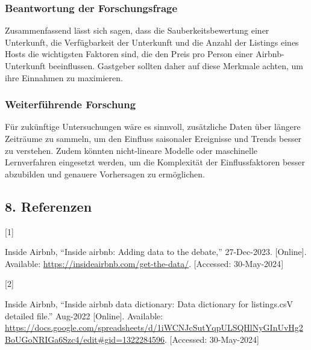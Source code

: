\documentclass[
  journal,
]{IEEEtran}%
\newlength{\cslhangindent}
\newlength{\csllabelwidth}
\newlength{\cslentryspacingunit} %
\newenvironment{CSLReferences}[2] %
 {%
  \setlength{\parindent}{0pt}
  \ifodd #1
  \let\oldpar\par
  \def\par{\hangindent=\cslhangindent\oldpar}
  \fi
  \setlength{\parskip}{#2\cslentryspacingunit}
 }%
 {}
\newcommand{\CSLLeftMargin}[1]{\parbox[t]{\csllabelwidth}{#1}}
\newcommand{\CSLRightInline}[1]{\parbox[t]{\linewidth - \csllabelwidth}{#1}\break}
\begin{document}
\hypertarget{beantwortung-der-forschungsfrage}{%
\subsubsection{Beantwortung der
Forschungsfrage}\label{beantwortung-der-forschungsfrage}}

Zusammenfassend lässt sich sagen, dass die Sauberkeitsbewertung einer
Unterkunft, die Verfügbarkeit der Unterkunft und die Anzahl der Listings
eines Hosts die wichtigsten Faktoren sind, die den Preis pro Person
einer Airbnb-Unterkunft beeinflussen. Gastgeber sollten daher auf diese
Merkmale achten, um ihre Einnahmen zu maximieren.

\hypertarget{weiterfuxfchrende-forschung}{%
\subsubsection{Weiterführende
Forschung}\label{weiterfuxfchrende-forschung}}

Für zukünftige Untersuchungen wäre es sinnvoll, zusätzliche Daten über
längere Zeiträume zu sammeln, um den Einfluss saisonaler Ereignisse und
Trends besser zu verstehen. Zudem könnten nicht-lineare Modelle oder
maschinelle Lernverfahren eingesetzt werden, um die Komplexität der
Einflussfaktoren besser abzubilden und genauere Vorhersagen zu
ermöglichen.

\hypertarget{referenzen}{%
\subsection*{8. Referenzen}\label{referenzen}}

\hypertarget{refs}{}
\begin{CSLReferences}{0}{0}
\leavevmode{}%
\CSLLeftMargin{{[}1{]} }%
\CSLRightInline{Inside Airbnb, {``Inside airbnb: Adding data to the
debate,''} 27-Dec-2023. {[}Online{]}. Available:
\url{https://insideairbnb.com/get-the-data/}. {[}Accessed:
30-May-2024{]}}

\leavevmode{}%
\CSLLeftMargin{{[}2{]} }%
\CSLRightInline{Inside Airbnb, {``Inside airbnb data dictionary: Data
dictionary for listings.csV detailed file.''} Aug-2022 {[}Online{]}.
Available:
\url{https://docs.google.com/spreadsheets/d/1iWCNJcSutYqpULSQHlNyGInUvHg2BoUGoNRIGa6Szc4/edit\#gid=1322284596}.
{[}Accessed: 30-May-2024{]}}

\end{CSLReferences}
\end{document}
